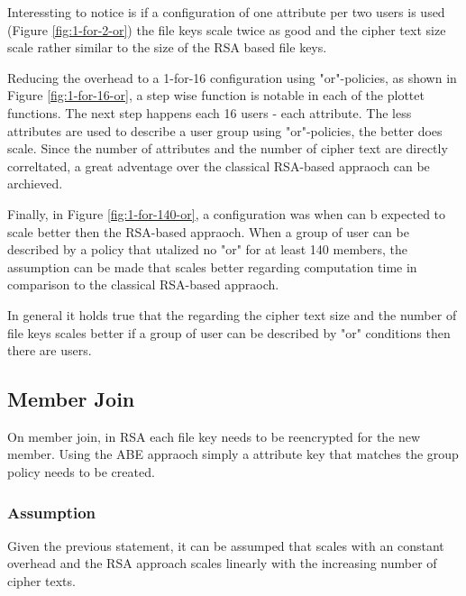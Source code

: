 Interessting to notice is if a configuration of one attribute per two users is used (Figure \ref{fig:1-for-2-or}) the file keys scale twice as good and the cipher text size scale rather similar to the size of the RSA based file keys. 

Reducing the overhead to a 1-for-16 configuration using "or"-policies, as shown in Figure \ref{fig:1-for-16-or}, a step wise function is notable in each of the plottet functions. The next step happens each 16 users - each attribute. The less attributes are used to describe a user group using "or"-policies, the better does \name scale. Since the number of attributes and the number of cipher text are directly correltated, a great adventage over the classical RSA-based appraoch can be archieved.

Finally, in Figure \ref{fig:1-for-140-or}, a configuration was when \name can b expected to scale better then the RSA-based appraoch. When a group of user can be described by a policy that utalized no "or" for at least 140 members, the assumption can be made that \name scales better regarding computation time in comparison to the classical RSA-based appraoch. 

In general it holds true that the regarding the cipher text size and the number of file keys \name scales better if a group of user can be described by "or" conditions then there are users. 

\subsection{Member Join}
On member join, in RSA each file key needs to be reencrypted for the new member. Using the ABE appraoch simply a attribute key that matches the group policy needs to be created. 

\subsubsection{Assumption}
Given the previous statement, it can be assumped that \name scales with an constant overhead and the RSA approach scales linearly with the increasing number of cipher texts.

